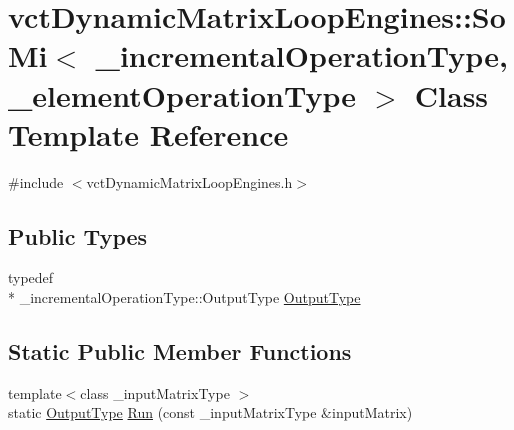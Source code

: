 \hypertarget{classvct_dynamic_matrix_loop_engines_1_1_so_mi}{\section{vct\-Dynamic\-Matrix\-Loop\-Engines\-:\-:So\-Mi$<$ \-\_\-incremental\-Operation\-Type, \-\_\-element\-Operation\-Type $>$ Class Template Reference}
\label{classvct_dynamic_matrix_loop_engines_1_1_so_mi}
}


{\ttfamily \#include $<$vct\-Dynamic\-Matrix\-Loop\-Engines.\-h$>$}

\subsection*{Public Types}
\begin{DoxyCompactItemize}
\item 
typedef \\*
\-\_\-incremental\-Operation\-Type\-::\-Output\-Type \hyperlink{classvct_dynamic_matrix_loop_engines_1_1_so_mi_a60f9f491da83d44e573f32395ef9278f}{Output\-Type}
\end{DoxyCompactItemize}
\subsection*{Static Public Member Functions}
\begin{DoxyCompactItemize}
\item 
{\footnotesize template$<$class \-\_\-input\-Matrix\-Type $>$ }\\static \hyperlink{classvct_dynamic_matrix_loop_engines_1_1_so_mi_a60f9f491da83d44e573f32395ef9278f}{Output\-Type} \hyperlink{classvct_dynamic_matrix_loop_engines_1_1_so_mi_ac46380ec17c5a8474334e7ffe2f638a0}{Run} (const \-\_\-input\-Matrix\-Type \&input\-Matrix)
\end{DoxyCompactItemize}



